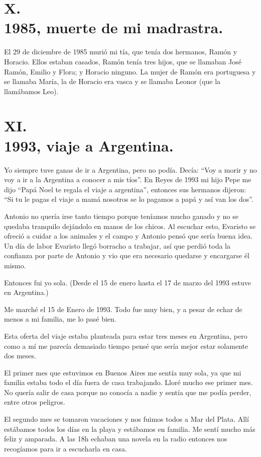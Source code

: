 \documentclass[12pt,a5paper]{book}
\begin{document}
\section*{X.\\1985, muerte de mi madrastra.}

El 29 de diciembre de 1985 murió mi tía, que tenía dos hermanos, Ramón y Horacio. Ellos estaban casados, Ramón tenía tres hijos, que se llamaban José Ramón, Emilio y Flora; y Horacio ninguno. La mujer de Ramón era portuguesa y se llamaba María, la de Horacio era vasca y se llamaba Leonor (que la llamábamos Leo).

\section*{XI.\\1993, viaje a Argentina.}

Yo siempre tuve ganas de ir a Argentina, pero no podía. Decía: “Voy a morir y no voy a ir a la Argentina a conocer a mis tíos”. 
En Reyes de 1993 mi hijo Pepe me dijo “Papá Noel te regala el viaje a argentina”, entonces sus hermanos dijeron: “Si tu le pagas el viaje a mamá nosotros se lo pagamos a papá y así van los dos”. 

Antonio no quería irse tanto tiempo porque teníamos mucho ganado y no se quedaba tranquilo dejándolo en manos de los chicos. Al escuchar esto, Evaristo se ofreció a cuidar a los animales y el campo y Antonio pensó que sería buena idea. Un día de labor Evaristo llegó borracho a trabajar, así que perdió toda la confianza por parte de Antonio y vio que era necesario quedarse y encargarse él mismo.

Entonces fui yo sola. (Desde el 15 de enero hasta el 17 de marzo del 1993 estuve en Argentina.)

Me marché el 15 de Enero  de 1993. Todo fue muy bien, y a pesar de echar de menos a mi familia, me lo pasé bien.
 
Esta oferta del viaje estaba planteada para estar tres meses en Argentina, pero como a mí me parecía demasiado tiempo pensé que sería mejor estar solamente dos meses.

El primer mes que estuvimos en Buenos Aires me sentía muy sola, ya que mi familia estaba todo el día fuera de casa trabajando. Lloré mucho ese primer mes. No quería salir de casa porque no conocía a nadie y sentía que me podía perder, entre otros peligros.

El segundo mes se tomaron vacaciones y nos fuimos todos a Mar del Plata. Allí estábamos todos los días en la playa y estábamos en familia. Me sentí mucho más feliz y amparada. A las 18h echaban una novela en la radio entonces nos recogíamos para ir a escucharla en casa.
\end{document}

